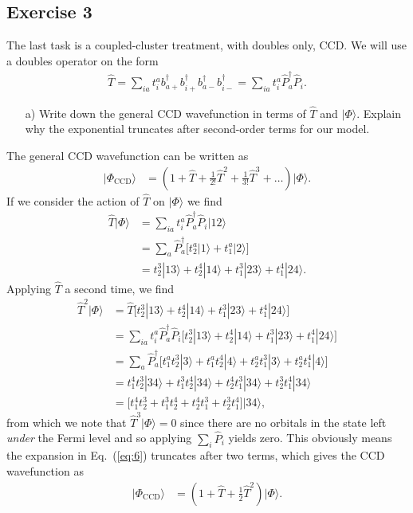 \documentclass[a4paper]{article}
\newcommand{\eq} [1]{Eq.\ (\ref{eq:#1})}
\newcommand{\nn}{\nonumber}
\begin{document}
\subsection*{Exercise 3}
The last task is a coupled-cluster treatment, with doubles only, CCD. We will use a doubles operator on the form 
\begin{align}
\hat T = \sum_{ia} t^a_i b_{a+}^\dagger b_{i+}^\dagger b_{a-}^\dagger b_{i-}^\dagger = \sum_{ia} t^a_i \hat P_a^\dagger \hat P_i.
\end{align}
\begin{exframe}
\begin{itemize}
  \item[a)] Write down the general CCD wavefunction in terms of $\hat T$ and $|\Phi\rangle$. Explain why the exponential truncates after second-order terms for our model.
\end{itemize}
\end{exframe}
The general CCD wavefunction can be written as 
\begin{align}
|\Phi_\text{CCD}\rangle &= \left(1 + \hat T + \frac{1}{2!}\hat T^2 + \frac{1}{3!}\hat T^3 + \dots \right) |\Phi\rangle. \label{eq:6}
\end{align}
If we consider the action of $\hat T$ on $|\Phi\rangle$ we find
\begin{align}
\hat T |\Phi\rangle &= \sum_{ia} t^a_i \hat P_a^\dagger \hat P_i |12\rangle \nn\\
%
&= \sum_{a} \hat P_a^\dagger \big[ t^a_2|1\rangle +  t^a_1|2\rangle \big] \nn\\
%
&=  t^3_2|13\rangle + t^4_2|14\rangle + t^3_1|23\rangle + t^4_1|24\rangle.
\end{align}
Applying $\hat T$ a second time, we find
\begin{align}
\hat T^2 |\Phi\rangle &= \hat T\Big[ t^3_2|13\rangle + t^4_2|14\rangle + t^3_1|23\rangle + t^4_1|24\rangle \Big] \nn\\
%
&= \sum_{ia} t^a_i \hat P^\dagger_a \hat P_i  \Big[ t^3_2|13\rangle + t^4_2|14\rangle + t^3_1|23\rangle + t^4_1|24\rangle \Big] \nn\\
%
&= \sum_{a} \hat P^\dagger_a \Big[ t_1^at^3_2|3\rangle + t_1^at^4_2|4\rangle + t^a_2t^3_1|3\rangle + t_2^at^4_1|4\rangle \Big] \nn\\
%
&= t_1^4t^3_2|34\rangle + t_1^3t^4_2|34\rangle + t^4_2t^3_1|34\rangle + t_2^3t^4_1|34\rangle \nn\\
%
&= \Big[ t_1^4t^3_2 + t_1^3t^4_2 + t^4_2t^3_1 + t_2^3t^4_1 \Big] |34\rangle, \label{eq:9}
\end{align}
from which we note that $\hat T^3 |\Phi\rangle=0$ since there are no orbitals in the state left \emph{under} the Fermi level and so applying $\sum_i \hat P_i$ yields zero. This obviously means the expansion in \eq{6} truncates after two terms, which gives the CCD wavefunction as
\begin{align}
|\Phi_\text{CCD}\rangle &= \left(1 + \hat T + \frac{1}{2}\hat T^2 \right) |\Phi\rangle. \label{eq:7}
\end{align}
\end{document}
